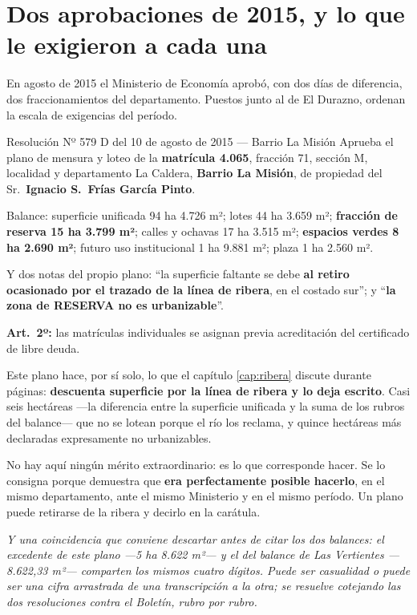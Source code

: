 \section{Dos aprobaciones de 2015, y lo que le exigieron a cada una}

En agosto de 2015 el Ministerio de Economía aprobó, con dos días de diferencia, dos fraccionamientos del departamento. Puestos junto al de El Durazno, ordenan la escala de exigencias del período.

\begin{ficha}{Resolución Nº 579 D del 10 de agosto de 2015 --- Barrio La Misión}
Aprueba el plano de mensura y loteo de la \textbf{matrícula 4.065}, fracción 71, sección M, localidad y departamento La Caldera, \textbf{Barrio La Misión}, de propiedad del Sr.\ \textbf{Ignacio S.\ Frías García Pinto}.

Balance: superficie unificada 94 ha 4.726 m²; lotes 44 ha 3.659 m²; \textbf{fracción de reserva 15 ha 3.799 m²}; calles y ochavas 17 ha 3.515 m²; \textbf{espacios verdes 8 ha 2.690 m²}; futuro uso institucional 1 ha 9.881 m²; plaza 1 ha 2.560 m².

Y dos notas del propio plano: ``la superficie faltante se debe \textbf{al retiro ocasionado por el trazado de la línea de ribera}, en el costado sur''; y ``\textbf{la zona de RESERVA no es urbanizable}''.

\textbf{Art.\ 2º:} las matrículas individuales se asignan previa acreditación del certificado de libre deuda.
\end{ficha}

\begin{cautela}
Este plano hace, por sí solo, lo que el capítulo \ref{cap:ribera} discute durante páginas: \textbf{descuenta superficie por la línea de ribera y lo deja escrito}. Casi seis hectáreas ---la diferencia entre la superficie unificada y la suma de los rubros del balance--- que no se lotean porque el río los reclama, y quince hectáreas más declaradas expresamente no urbanizables.

No hay aquí ningún mérito extraordinario: es lo que corresponde hacer. Se lo consigna porque demuestra que \textbf{era perfectamente posible hacerlo}, en el mismo departamento, ante el mismo Ministerio y en el mismo período. Un plano puede retirarse de la ribera y decirlo en la carátula.

\textit{Y una coincidencia que conviene descartar antes de citar los dos balances: el excedente de este plano ---5 ha 8.622 m²--- y el del balance de Las Vertientes ---8.622,33 m²--- comparten los mismos cuatro dígitos. Puede ser casualidad o puede ser una cifra arrastrada de una transcripción a la otra; se resuelve cotejando las dos resoluciones contra el Boletín, rubro por rubro.}
\end{cautela}

